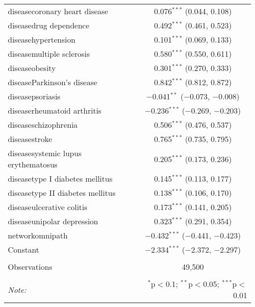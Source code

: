 \begin{table}[!htbp]
\begin{tabular}{@{\extracolsep{5pt}}lc}
  diseasecoronary heart disease & 0.076$^{***}$ (0.044, 0.108) \\ 
  diseasedrug dependence & 0.492$^{***}$ (0.461, 0.523) \\ 
  diseasehypertension & 0.101$^{***}$ (0.069, 0.133) \\ 
  diseasemultiple sclerosis & 0.580$^{***}$ (0.550, 0.611) \\ 
  diseaseobesity & 0.301$^{***}$ (0.270, 0.333) \\ 
  diseaseParkinson's disease & 0.842$^{***}$ (0.812, 0.872) \\ 
  diseasepsoriasis & $-$0.041$^{**}$ ($-$0.073, $-$0.008) \\ 
  diseaserheumatoid arthritis & $-$0.236$^{***}$ ($-$0.269, $-$0.203) \\ 
  diseaseschizophrenia & 0.506$^{***}$ (0.476, 0.537) \\ 
  diseasestroke & 0.765$^{***}$ (0.735, 0.795) \\ 
  diseasesystemic lupus erythematosus & 0.205$^{***}$ (0.173, 0.236) \\ 
  diseasetype I diabetes mellitus & 0.145$^{***}$ (0.113, 0.177) \\ 
  diseasetype II diabetes mellitus & 0.138$^{***}$ (0.106, 0.170) \\ 
  diseaseulcerative colitis & 0.173$^{***}$ (0.141, 0.205) \\ 
  diseaseunipolar depression & 0.323$^{***}$ (0.291, 0.354) \\ 
  networkomnipath & $-$0.432$^{***}$ ($-$0.441, $-$0.423) \\ 
  Constant & $-$2.334$^{***}$ ($-$2.372, $-$2.297) \\ 
 \hline \\[-1.8ex] 
Observations & 49,500 \\ 
\hline 
\hline \\[-1.8ex] 
\textit{Note:}  & \multicolumn{1}{r}{$^{*}$p$<$0.1; $^{**}$p$<$0.05; $^{***}$p$<$0.01} \\ 
\end{tabular} 
\end{table} 
